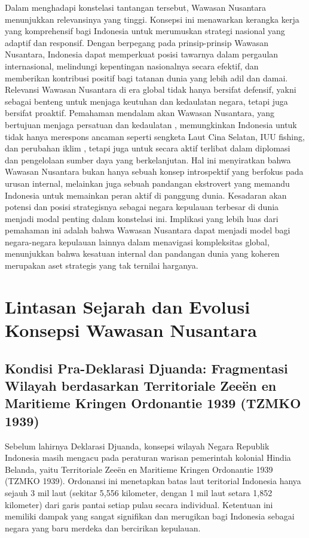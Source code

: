 \documentclass[12pt, a4paper]{article}
\begin{document}
Dalam menghadapi konstelasi tantangan tersebut, Wawasan Nusantara menunjukkan relevansinya yang tinggi. Konsepsi ini menawarkan kerangka kerja yang komprehensif bagi Indonesia untuk merumuskan strategi nasional yang adaptif dan responsif. Dengan berpegang pada prinsip-prinsip Wawasan Nusantara, Indonesia dapat memperkuat posisi tawarnya dalam pergaulan internasional, melindungi kepentingan nasionalnya secara efektif, dan memberikan kontribusi positif bagi tatanan dunia yang lebih adil dan damai. Relevansi Wawasan Nusantara di era global tidak hanya bersifat defensif, yakni sebagai benteng untuk menjaga keutuhan dan kedaulatan negara, tetapi juga bersifat proaktif. Pemahaman mendalam akan Wawasan Nusantara, yang bertujuan menjaga persatuan dan kedaulatan , memungkinkan Indonesia untuk tidak hanya merespons ancaman seperti sengketa Laut Cina Selatan, IUU fishing, dan perubahan iklim , tetapi juga untuk secara aktif terlibat dalam diplomasi  dan pengelolaan sumber daya yang berkelanjutan. Hal ini menyiratkan bahwa Wawasan Nusantara bukan hanya sebuah konsep introspektif yang berfokus pada urusan internal, melainkan juga sebuah pandangan ekstrovert yang memandu Indonesia untuk memainkan peran aktif di panggung dunia. Kesadaran akan potensi dan posisi strategisnya sebagai negara kepulauan terbesar di dunia menjadi modal penting dalam konstelasi ini. Implikasi yang lebih luas dari pemahaman ini adalah bahwa Wawasan Nusantara dapat menjadi model bagi negara-negara kepulauan lainnya dalam menavigasi kompleksitas global, menunjukkan bahwa kesatuan internal dan pandangan dunia yang koheren merupakan aset strategis yang tak ternilai harganya.  

\section{Lintasan Sejarah dan Evolusi Konsepsi Wawasan Nusantara}
\subsection*{Kondisi Pra-Deklarasi Djuanda: Fragmentasi Wilayah berdasarkan Territoriale Zeeën en Maritieme Kringen Ordonantie 1939 (TZMKO 1939)}

Sebelum lahirnya Deklarasi Djuanda, konsepsi wilayah Negara Republik Indonesia masih mengacu pada peraturan warisan pemerintah kolonial Hindia Belanda, yaitu Territoriale Zeeën en Maritieme Kringen Ordonantie 1939 (TZMKO 1939). Ordonansi ini menetapkan batas laut teritorial Indonesia hanya sejauh 3 mil laut (sekitar 5,556 kilometer, dengan 1 mil laut setara 1,852 kilometer) dari garis pantai setiap pulau secara individual. Ketentuan ini memiliki dampak yang sangat signifikan dan merugikan bagi Indonesia sebagai negara yang baru merdeka dan bercirikan kepulauan.  
\end{document}
